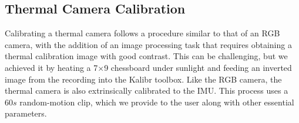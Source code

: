 \documentclass[10pt,twocolumn,letterpaper]{article}
\begin{document}
\subsection{Thermal Camera Calibration} 

Calibrating a thermal camera follows a procedure similar to that of an RGB camera, with the addition of an image processing task that requires obtaining a thermal calibration image with good contrast. This can be challenging, but we achieved it by heating a 7$\times$9 chessboard under sunlight and feeding an inverted image from the recording into the Kalibr toolbox. Like the RGB camera, the thermal camera is also extrinsically calibrated to the IMU. This process uses a $60s$ random-motion clip, which we provide to the user along with other essential parameters.



\end{document}
